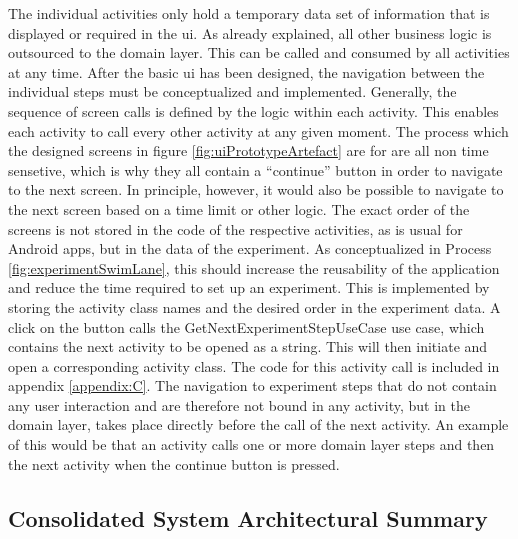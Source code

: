 The individual activities only hold a temporary data set of information that is displayed or required in the \ac{ui}. As already explained, all other business logic is outsourced to the domain layer. This can be called and consumed by all activities at any time. After the basic \ac{ui} has been designed, the navigation between the individual steps must be conceptualized and implemented. Generally, the sequence of screen calls is defined by the logic within each activity. This enables each activity to call every other activity at any given moment. The process which the designed screens in figure \ref{fig:uiPrototypeArtefact} are for are all non time sensetive, which is why they all contain a \enquote{continue} button in order to navigate to the next screen. In principle, however, it would also be possible to navigate to the next screen based on a time limit or other logic. The exact order of the screens is not stored in the code of the respective activities, as is usual for Android apps, but in the data of the experiment. As conceptualized in Process \ref{fig:experimentSwimLane}, this should increase the reusability of the application and reduce the time required to set up an experiment. This is implemented by storing the activity class names and the desired order in the experiment data. A click on the button calls the GetNextExperimentStepUseCase use case, which contains the next activity to be opened as a string. This will then initiate and open a corresponding activity class. The code for this activity call is included in appendix \ref{appendix:C}. The navigation to experiment steps that do not contain any user interaction and are therefore not bound in any activity, but in the domain layer, takes place directly before the call of the next activity. An example of this would be that an activity calls one or more domain layer steps and then the next activity when the continue button is pressed.


\subsection{Consolidated System Architectural Summary}\label{subsec:completeArchitecture}


